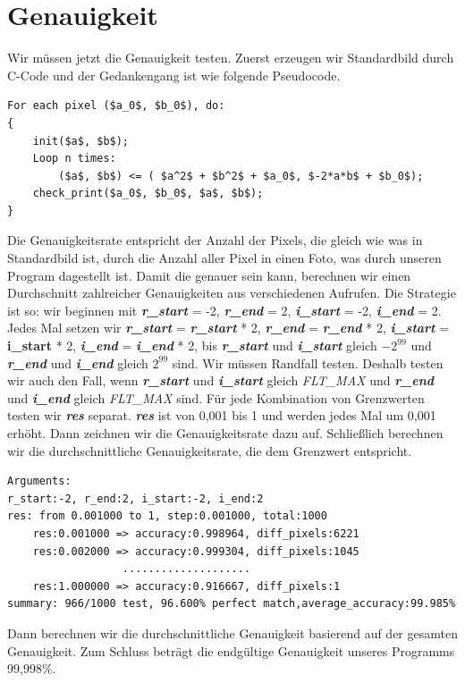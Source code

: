 \documentclass[course=erap]{aspdoc}
\begin{document}
\section{Genauigkeit}\label{correction}
Wir müssen jetzt die Genauigkeit testen.
Zuerst erzeugen wir Standardbild durch C-Code und der Gedankengang ist wie folgende Pseudocode.
\begin{lstlisting}[mathescape=true]
For each pixel ($a_0$, $b_0$), do:
{
    init($a$, $b$);
    Loop n times:
        ($a$, $b$) <= ( $a^2$ + $b^2$ + $a_0$, $-2*a*b$ + $b_0$);
    check_print($a_0$, $b_0$, $a$, $b$);
}
\end{lstlisting}
Die Genauigkeitsrate entspricht der Anzahl der Pixels, die gleich wie was in Standardbild ist, durch die Anzahl aller Pixel in einen Foto, was durch unseren Program dagestellt ist. Damit die genauer sein kann, berechnen wir einen Durchschnitt zahlreicher Genauigkeiten aus verschiedenen Aufrufen. Die Strategie ist so: wir beginnen mit \textbf{\emph{r\_start}} = -2, \emph{\textbf{r\_end}} = 2, \textbf{\emph{i\_start}} = -2, \emph{\textbf{i\_end}} = 2. Jedes Mal setzen wir \textbf{\emph{r\_start}} = \emph{\textbf{r\_start}} * 2, \textbf{\emph{r\_end}} = \emph{\textbf{r\_end}} * 2, \textbf{\emph{i\_start}} = \textbf{\textbf{i\_start}} * 2, \emph{\textbf{i\_end}} = \textbf{\emph{i\_end}} * 2, bis \emph{\textbf{r\_start}} und \textbf{\emph{i\_start}} gleich $-2^{99}$ und \emph{\textbf{r\_end}} und \textbf{\emph{i\_end}} gleich $2^{99}$ sind. Wir müssen Randfall testen. Deshalb testen wir auch den Fall, wenn \emph{\textbf{r\_start}} und \textbf{\emph{i\_start}} gleich \emph{FLT\_MAX} und \emph{\textbf{r\_end}} und \textbf{\emph{i\_end}} gleich \emph{FLT\_MAX} sind. Für jede Kombination von Grenzwerten testen wir \emph{\textbf{res}} separat. \textbf{\emph{res}} ist von 0,001 bis 1 und werden jedes Mal um 0,001 erhöht. Dann zeichnen wir die Genauigkeitsrate dazu auf. Schließlich berechnen wir die durchschnittliche Genauigkeitsrate, die dem Grenzwert entspricht.
\begin{lstlisting}
Arguments:
r_start:-2, r_end:2, i_start:-2, i_end:2
res: from 0.001000 to 1, step:0.001000, total:1000
	res:0.001000 => accuracy:0.998964, diff_pixels:6221
	res:0.002000 => accuracy:0.999304, diff_pixels:1045
                  ....................
    res:1.000000 => accuracy:0.916667, diff_pixels:1
summary: 966/1000 test, 96.600% perfect match,average_accuracy:99.985%
\end{lstlisting}
Dann berechnen wir die durchschnittliche Genauigkeit basierend auf der gesamten Genauigkeit. Zum Schluss beträgt die endgültige Genauigkeit unseres Programms 99,998\%.
\end{document}
